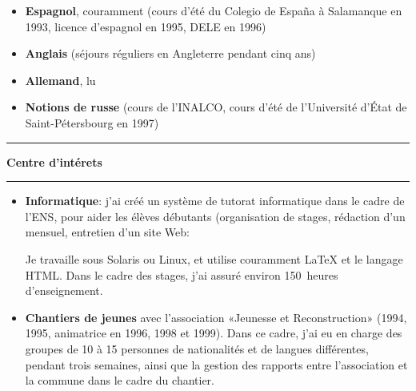 \documentclass[a4paper,11pt]{article} %
\newcommand{\titre}[1]{%
	\begin{center}
	\bigskip
	\rule{\textwidth}{1pt}
	\par\vspace{0.1cm}
        \textbf{\LARGE #1}
	\par\rule{\textwidth}{1pt}
	\end{center}
	\bigskip
	}
\begin{document}
\begin{itemize} 

\item \textbf{Espagnol}, couramment (cours d'été du Colegio de España à
Salamanque en 1993, licence d'espagnol en 1995, DELE en 1996)

\medskip
\item \textbf{Anglais}  (séjours réguliers en Angleterre  pendant cinq ans)

\medskip
\item \textbf{Allemand}, lu

\medskip
\item \textbf{Notions de russe} (cours de l'INALCO, cours d'été de
l'Université d'État de Saint-Pétersbourg en 1997)

\end{itemize}

\titre{Centre d'intérets}

\begin{itemize}

\item \textbf{Informatique}: j'ai créé un système de tutorat informatique dans
le cadre de l'ENS, pour aider les élèves débutants (organisation de stages,
rédaction d'un mensuel, entretien d'un site Web: 

Je travaille sous Solaris ou Linux, et utilise couramment LaTeX et le langage
HTML. Dans le cadre des stages, j'ai assuré environ 150~heures d'enseignement.

\item \textbf{Chantiers de jeunes} avec l'association «Jeunesse et
Reconstruction» (1994, 1995, animatrice en 1996, 1998 et 1999).  Dans ce
cadre, j'ai eu en charge  des groupes de 10 à 15 personnes de nationalités et
de langues différentes, pendant trois semaines, ainsi que la gestion des
rapports entre l'association et la commune dans le cadre du chantier.

\end{itemize}
\end{document}
